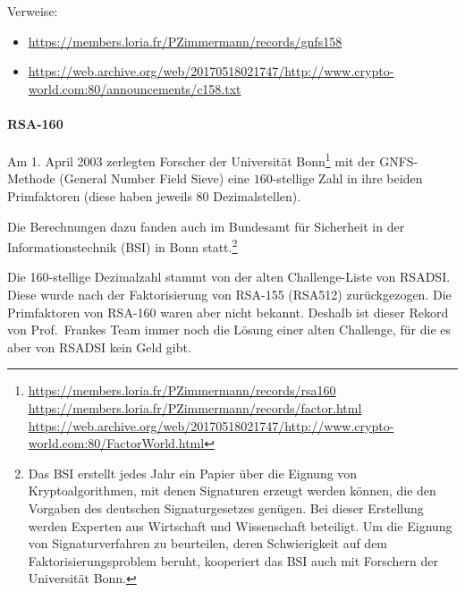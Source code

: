 \begin{refsegment}
\begin{minipage}{\textwidth}
Verweise:
\begin{itemize}[nosep,label=-]
\item \url{https://members.loria.fr/PZimmermann/records/gnfs158}
\item \url{https://web.archive.org/web/20170518021747/http://www.crypto-world.com:80/announcements/c158.txt}
\end{itemize}
\end{minipage}



\paragraph*{RSA-160} \label{RSA-160} \mbox{}
\hypertarget{RSA-160-chap3}{}

Am 1. April 2003 zerlegten Forscher der Universität Bonn\footnote{%
          \url{https://members.loria.fr/PZimmermann/records/rsa160}\\
          \url{https://members.loria.fr/PZimmermann/records/factor.html}\\
          \url{https://web.archive.org/web/20170518021747/http://www.crypto-world.com:80/FactorWorld.html}
}
mit der GNFS-Methode (General Number Field Sieve)  eine $160$-stellige Zahl in ihre beiden Primfaktoren
(diese haben jeweils 80 Dezimalstellen).

Die Berechnungen dazu fanden auch im Bundesamt für Sicherheit in der
Informationstechnik (BSI) in Bonn statt.\footnote{%
Das BSI  erstellt jedes Jahr ein Papier über die Eignung von
Kryptoalgorithmen, mit denen Signaturen erzeugt werden können,
die den Vorgaben des deutschen Signaturgesetzes genügen.
Bei dieser Erstellung werden Experten aus Wirtschaft und Wissenschaft
beteiligt. Um die Eignung von Signaturverfahren zu beurteilen, deren
Schwierigkeit auf dem Faktorisierungsproblem beruht,
kooperiert das BSI auch mit Forschern der Universität Bonn.
}

Die 160-stellige Dezimalzahl stammt von der alten Challenge-Liste von RSADSI.
Diese wurde nach der Faktorisierung von RSA-155 (RSA512) zurückgezogen.
Die Primfaktoren von RSA-160 waren aber nicht bekannt.
Deshalb ist dieser Rekord von Prof.\ Frankes Team immer noch die Lösung
einer alten Challenge, für die es aber von RSADSI kein Geld gibt.


\end{refsegment}
